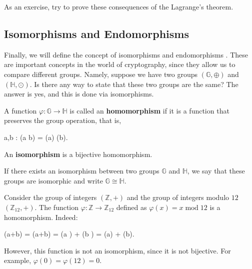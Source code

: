 \documentclass[../lecture-notes-148x210.tex]{subfiles}
\begin{document}
As an exercise, try to prove these consequences of the Lagrange's theorem.



\subsection{Isomorphisms and Endomorphisms}

Finally, we will define the concept of isomorphisms and endomorphisms \cite[section 9]{Judson_2012}. These are important concepts in the world of cryptography, since they allow us to compare different groups. Namely, 
suppose we have two groups $(\mathbb{G},\oplus)$ and $(\mathbb{H}, \odot)$. Is there any way to state that these two groups are the same? The answer is yes, and this is done via isomorphisms.

\begin{definition}
    A function $\varphi: \mathbb{G} \to \mathbb{H}$ is called an \textbf{homomorphism} if it is a function that preserves the group operation, that is, 
    \begin{xequation}
        \forall a,b \in {}: \varphi(a \oplus b) = \varphi(a) \odot \varphi(b).
    \end{xequation}
\end{definition}

\begin{definition}
    An \textbf{isomorphism} is a bijective homomorphism.
\end{definition}

\begin{definition}
    If there exists an isomorphism between two groups $\mathbb{G}$ and $\mathbb{H}$, we say that these groups are isomorphic and write $\mathbb{G} \cong \mathbb{H}$.
\end{definition}

\begin{example}
    Consider the group of integers $(\mathbb{Z},+)$ and the group of integers modulo $12$ $(\mathbb{Z}_{12},+)$. The function $\varphi: \mathbb{Z} \to \mathbb{Z}_{12}$ defined as $\varphi(x) = x \;\text{mod}\; 12$ is a homomorphism. Indeed:
    \begin{xequation}
        \varphi(a+b) = (a+b) \; = (a \;) + (b \;) = \varphi(a) + \varphi(b).
    \end{xequation}

    However, this function is not an isomorphism, since it is not bijective. For example, $\varphi(0) = \varphi(12) = 0$.
\end{example}
\end{document}
